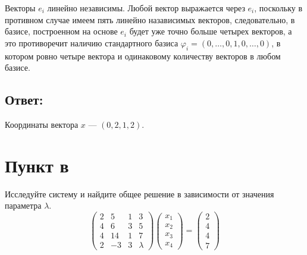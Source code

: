 \documentclass[12pt]{article}
\begin{document}
    Векторы $e_i$ линейно независимы. Любой вектор выражается через $e_i$, поскольку в противном случае имеем пять линейно назависимых векторов, следовательно, в базисе, построенном
    на основе $e_i$ будет уже точно больше четырех векторов, а это противоречит наличию стандартного базиса $\varphi_i = \left ( 0, \dots, 0, 1, 0, \dots, 0 \right )$, в котором ровно четыре
    вектора и одинаковому количеству векторов в любом базисе.

    \subsection*{Ответ:}
    Координаты вектора $x$ --- $\left ( 0, 2, 1, 2 \right )$.

    \section*{Пункт в}
    Исследуйте систему и найдите общее решение в зависимости от значения параметра $\lambda$.
    \[
        \begin{pmatrix}
            2 & 5  & 1 & 3       \\
            4 & 6  & 3 & 5       \\
            4 & 14 & 1 & 7       \\
            2 & -3 & 3 & \lambda
        \end{pmatrix}
        \begin{pmatrix}
            x_1 \\ x_2 \\ x_3 \\ x_4
        \end{pmatrix}
        =
        \begin{pmatrix}
            2 \\ 4 \\ 4 \\ 7
        \end{pmatrix}
    \]
\end{document}
